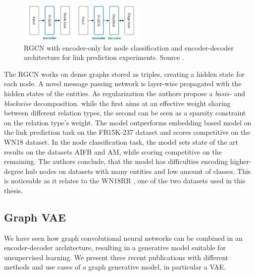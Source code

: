 \begin{figure}[h]
    \centering
    \includegraphics[width=0.55\textwidth]{data/images/RGCN.png}
    \caption{RGCN with encoder-only for node classification and encoder-decoder architecture for link prediction experiments. Source \cite{gangemi_modeling_2018}.}
    \label{fig:RGCN}
\end{figure}

The RGCN works on dense graphs stored as triples, creating a hidden state for each node. A novel message passing network is layer-wise propagated with the hidden states of the entities. As regularization the authors propose a \textit{basis-} and \textit{blockwise} decomposition. while the first  aims at an effective weight sharing between different relation types, the second  can be seen as a sparsity constraint on the relation type's weight. The model outperforms embedding based model on the link prediction task on the FB15K-237 dataset and scores competitive on the WN18 dataset. In the node classification task, the model sets state of the art results on the datasets AIFB and AM, while scoring competitive on the remaining. The authors conclude, that the model has difficulties encoding higher-degree hub nodes on datasets with many entities and low amount of classes. This is noticeable as it relates to the WN18RR \cite{battaglia_relational_2018}, one of the two datasets used in this thesis.  


\subsection{Graph VAE}
We have seen how graph convolutional neural networks can be combined in an encoder-decoder architecture, resulting in a generative model suitable for unsupervised learning. We present three recent publications with different methods and use cases of a graph generative model, in particular a VAE.


